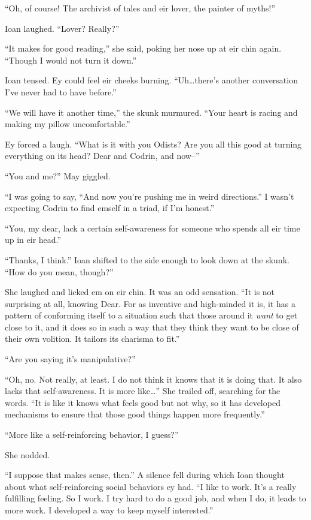 ``Oh, of course! The archivist of tales and eir lover, the painter of myths!''

Ioan laughed. ``Lover? Really?''

``It makes for good reading,'' she said, poking her nose up at eir chin again. ``Though I would not turn it down.''

Ioan tensed. Ey could feel eir cheeks burning. ``Uh\ldots there's another conversation I've never had to have before.''

``We will have it another time,'' the skunk murmured. ``Your heart is racing and making my pillow uncomfortable.''

Ey forced a laugh. ``What is it with you Odists? Are you all this good at turning everything on its head? Dear and Codrin, and now--''

``You and me?'' May giggled.

``I was going to say, ``And now you're pushing me in weird directions.'' I wasn't expecting Codrin to find emself in a triad, if I'm honest.''

``You, my dear, lack a certain self-awareness for someone who spends all eir time up in eir head.''

``Thanks, I think.'' Ioan shifted to the side enough to look down at the skunk. ``How do you mean, though?''

She laughed and licked em on eir chin. It was an odd sensation. ``It is not surprising at all, knowing Dear. For as inventive and high-minded it is, it has a pattern of conforming itself to a situation such that those around it \emph{want} to get close to it, and it does so in such a way that they think they want to be close of their own volition. It tailors its charisma to fit.''

``Are you saying it's manipulative?''

``Oh, no. Not really, at least. I do not think it knows that it is doing that. It also lacks that self-awareness. It is more like\ldots{}'' She trailed off, searching for the words. ``It is like it knows what feels good but not why, so it has developed mechanisms to ensure that those good things happen more frequently.''

``More like a self-reinforcing behavior, I guess?''

She nodded.

``I suppose that makes sense, then.'' A silence fell during which Ioan thought about what self-reinforcing social behaviors ey had. ``I like to work. It's a really fulfilling feeling. So I work. I try hard to do a good job, and when I do, it leads to more work. I developed a way to keep myself interested.''

